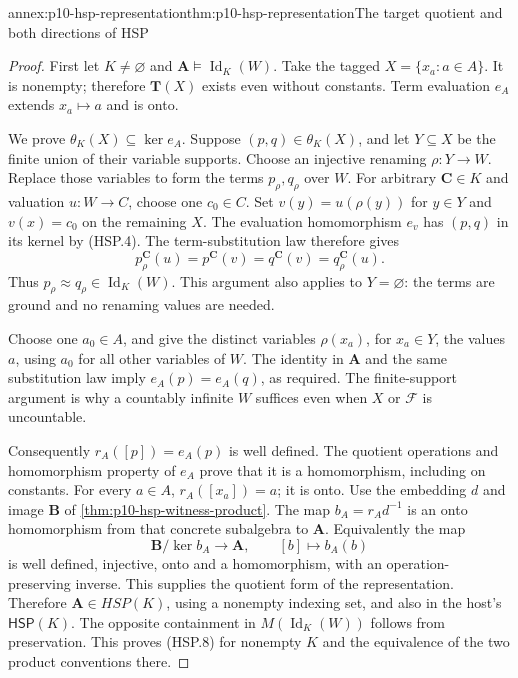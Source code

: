 \begin{annexitem}{annex:p10-hsp-representation}{thm:p10-hsp-representation}{The target quotient and both directions of HSP}
\begin{proof}
First let \(K\ne\varnothing\) and
\(\mathbf A\models\operatorname{Id}_K(W)\).
Take the tagged \(X=\{x_a:a\in A\}\).
It is nonempty; therefore \(\mathbf T(X)\) exists
even without constants. Term evaluation \(e_A\)
extends \(x_a\mapsto a\) and is onto.

We prove \(\theta_K(X)\subseteq\ker e_A\).
Suppose \((p,q)\in\theta_K(X)\), and let
\(Y\subseteq X\) be the finite union of their variable
supports. Choose an injective renaming
\(\rho:Y\to W\). Replace those variables to form
the terms \(p_\rho,q_\rho\) over \(W\).
For arbitrary \(\mathbf C\in K\) and
valuation \(u:W\to C\), choose one \(c_0\in C\).
Set \(v(y)=u(\rho(y))\) for \(y\in Y\) and
\(v(x)=c_0\) on the remaining \(X\).
The evaluation homomorphism \(e_v\) has
\((p,q)\) in its kernel by (HSP.4).
The term-substitution law therefore gives
\[
 p_\rho^{\mathbf C}(u)
    =p^{\mathbf C}(v)
    =q^{\mathbf C}(v)
    =q_\rho^{\mathbf C}(u).
 \]
Thus \(p_\rho\approx q_\rho\in\operatorname{Id}_K(W)\).
This argument also applies to \(Y=\varnothing\):
the terms are ground and no renaming values are needed.

Choose one \(a_0\in A\), and give the distinct
variables \(\rho(x_a)\), for \(x_a\in Y\), the
values \(a\), using \(a_0\) for all other variables
of \(W\). The identity in \(\mathbf A\)
and the same substitution law imply
\(e_A(p)=e_A(q)\), as required.
The finite-support argument is why a countably
infinite \(W\) suffices even when \(X\) or \(\mathcal F\)
is uncountable.

Consequently \(r_A([p])=e_A(p)\) is well defined.
The quotient operations and homomorphism property
of \(e_A\) prove that it is a homomorphism, including
on constants. For every \(a\in A\),
\(r_A([x_a])=a\); it is onto.
Use the embedding \(d\) and image \(\mathbf B\)
of \cref{thm:p10-hsp-witness-product}.
The map \(b_A=r_A d^{-1}\) is an onto homomorphism
from that concrete subalgebra to \(\mathbf A\).
Equivalently the map
\[
 \mathbf B/\ker b_A\longrightarrow\mathbf A,\qquad
 [b]\longmapsto b_A(b)
 \]
is well defined, injective, onto and a homomorphism,
with an operation-preserving inverse.
This supplies the quotient form of the representation.
Therefore \(\mathbf A\in HSP(K)\), using a
nonempty indexing set, and also in the host's
\(\mathsf H\mathsf S\mathsf P(K)\).
The opposite containment in \(M(\operatorname{Id}_K(W))\)
follows from preservation. This proves (HSP.8)
for nonempty \(K\) and the equivalence of the two
product conventions there.


\end{proof}
\end{annexitem}
